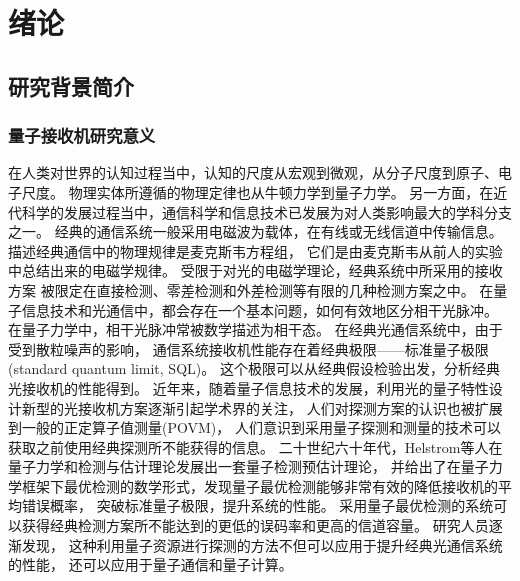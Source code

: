 \chapter{绪论}
\section{研究背景简介}

\subsection{量子接收机研究意义}
在人类对世界的认知过程当中，认知的尺度从宏观到微观，从分子尺度到原子、电子尺度。
物理实体所遵循的物理定律也从牛顿力学到量子力学。
另一方面，在近代科学的发展过程当中，通信科学和信息技术已发展为对人类影响最大的学科分支之一。
经典的通信系统一般采用电磁波为载体，在有线或无线信道中传输信息。
描述经典通信中的物理规律是麦克斯韦方程组，
它们是由麦克斯韦从前人的实验中总结出来的电磁学规律。
受限于对光的电磁学理论，经典系统中所采用的接收方案
被限定在直接检测、零差检测和外差检测等有限的几种检测方案之中。
在量子信息技术和光通信中，都会存在一个基本问题，如何有效地区分相干光脉冲。
在量子力学中，相干光脉冲常被数学描述为相干态\cite{glauber1963coherent}。
在经典光通信系统中，由于受到散粒噪声的影响，
通信系统接收机性能存在着经典极限——标准量子极限(standard quantum limit, SQL)。
这个极限可以从经典假设检验出发，分析经典光接收机的性能得到\cite{helstrom1976quantum}。
近年来，随着量子信息技术的发展，利用光的量子特性设计新型的光接收机方案逐渐引起学术界的关注，
人们对探测方案的认识也被扩展到一般的正定算子值测量(POVM)，
人们意识到采用量子探测和测量的技术可以获取之前使用经典探测所不能获得的信息。
二十世纪六十年代，Helstrom等人在量子力学和检测与估计理论发展出一套量子检测预估计理论，
并给出了在量子力学框架下最优检测的数学形式，发现量子最优检测能够非常有效的降低接收机的平均错误概率，
突破标准量子极限，提升系统的性能\cite{helstrom1976quantum,helstrom1967detection,yuen1970optimal, yuen1975optimum}。
采用量子最优检测的系统可以获得经典检测方案所不能达到的更低的误码率\cite{helstrom1976quantum}和更高的信道容量\cite{hausladen1996classical}。
研究人员逐渐发现，
这种利用量子资源进行探测的方法不但可以应用于提升经典光通信系统的性能\cite{helstrom1976quantum}，
还可以应用于量子通信\cite{gisin2007quantum}和量子计算\cite{ladd2010quantum}。



